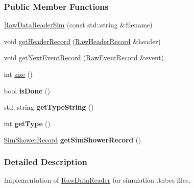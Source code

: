 \subsubsection*{Public Member Functions}
\begin{DoxyCompactItemize}
\item 
\hyperlink{classRawDataReaderSim_a3b39f633634f97e2962f80f2c60bf8b0}{RawDataReaderSim} (const std::string \&filename)
\item 
void \hyperlink{classRawDataReaderSim_acd4f407d9c8b8df95eb88213e6625f5f}{getHeaderRecord} (\hyperlink{structRawHeaderRecord}{RawHeaderRecord} \&header)
\item 
\hypertarget{classRawDataReaderSim_af7c83e5db612afd37d2e0daeecb33e32}{
void \hyperlink{classRawDataReaderSim_af7c83e5db612afd37d2e0daeecb33e32}{getNextEventRecord} (\hyperlink{structRawEventRecord}{RawEventRecord} \&event)}
\label{classRawDataReaderSim_af7c83e5db612afd37d2e0daeecb33e32}

\item 
\hypertarget{classRawDataReaderSim_aedc584c28c0b04a8ddeedf2680cd316f}{
int \hyperlink{classRawDataReaderSim_aedc584c28c0b04a8ddeedf2680cd316f}{size} ()}
\label{classRawDataReaderSim_aedc584c28c0b04a8ddeedf2680cd316f}

\item 
\hypertarget{classRawDataReaderSim_a97dae8ae36836c8a7ad8da1600cf3319}{
bool {\bfseries isDone} ()}
\label{classRawDataReaderSim_a97dae8ae36836c8a7ad8da1600cf3319}

\item 
\hypertarget{classRawDataReaderSim_aa7ab2d94ea9b7b87db0f1a83d3b592ff}{
std::string {\bfseries getTypeString} ()}
\label{classRawDataReaderSim_aa7ab2d94ea9b7b87db0f1a83d3b592ff}

\item 
\hypertarget{classRawDataReaderSim_abcd7b3c9361abd1efb9064945844d06e}{
int {\bfseries getType} ()}
\label{classRawDataReaderSim_abcd7b3c9361abd1efb9064945844d06e}

\item 
\hypertarget{classRawDataReaderSim_ac03bf61391a4d740f91f5905bb3cf7c1}{
\hyperlink{structSimShowerRecord}{SimShowerRecord} {\bfseries getSimShowerRecord} ()}
\label{classRawDataReaderSim_ac03bf61391a4d740f91f5905bb3cf7c1}

\end{DoxyCompactItemize}


\subsubsection{Detailed Description}
Implementation of \hyperlink{classRawDataReader}{RawDataReader} for simulation .tubes files. 

